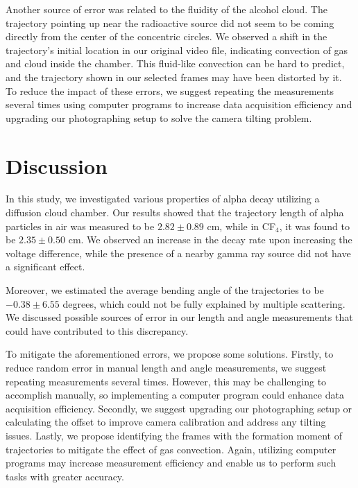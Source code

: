\documentclass[a4paper]{tufte-handout}
\begin{document}
Another source of error was related to the fluidity of the alcohol cloud. The trajectory pointing up near the radioactive source did not seem to be coming directly from the center of the concentric circles. We observed a shift in the trajectory's initial location in our original video file, indicating convection of gas and cloud inside the chamber. This fluid-like convection can be hard to predict, and the trajectory shown in our selected frames may have been distorted by it. To reduce the impact of these errors, we suggest repeating the measurements several times using computer programs to increase data acquisition efficiency and upgrading our photographing setup to solve the camera tilting problem.




\newpage
\section{Discussion}

In this study, we investigated various properties of alpha decay utilizing a diffusion cloud chamber. Our results showed that the trajectory length of alpha particles in air was measured to be $2.82\pm 0.89$ cm, while in CF$_4$, it was found to be $2.35 \pm 0.50$ cm. We observed an increase in the decay rate upon increasing the voltage difference, while the presence of a nearby gamma ray source did not have a significant effect.

Moreover, we estimated the average bending angle of the trajectories to be $-0.38\pm 6.55$ degrees, which could not be fully explained by multiple scattering. We discussed possible sources of error in our length and angle measurements that could have contributed to this discrepancy.

To mitigate the aforementioned errors, we propose some solutions. Firstly, to reduce random error in manual length and angle measurements, we suggest repeating measurements several times. However, this may be challenging to accomplish manually, so implementing a computer program could enhance data acquisition efficiency. Secondly, we suggest upgrading our photographing setup or calculating the offset to improve camera calibration and address any tilting issues. Lastly, we propose identifying the frames with the formation moment of trajectories to mitigate the effect of gas convection. Again, utilizing computer programs may increase measurement efficiency and enable us to perform such tasks with greater accuracy.




% 
% 
\end{document}
